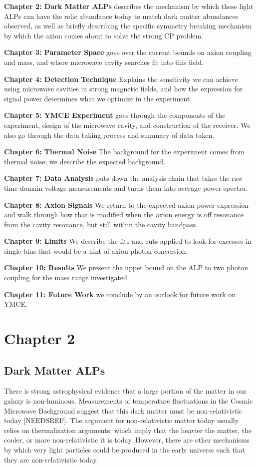 \documentclass[11pt]{book}
\begin{document}
\textbf{Chapter 2: Dark Matter ALPs} describes the mechanism by which these light ALPs can have the relic abundance today to match dark matter abundances observed, as well as briefly describing the specific symmetry breaking mechanism by which the axion comes about to solve the strong CP problem.

\textbf{Chapter 3: Parameter Space} goes over the current bounds on axion coupling and mass, and where microwave cavity searches fit into this field.

\textbf{Chapter 4: Detection Technique} Explains the sensitivity we can achieve using microwave cavities in strong magnetic fields, and how the expression for signal power determines what we optimize in the experiment

\textbf{Chapter 5: YMCE Experiment} goes through the components of the experiment, design of the microwave cavity, and construction of the receiver. We also go through the data taking process and summary of data taken.

\textbf{Chapter 6: Thermal Noise} The background for the experiment comes from thermal noise; we describe the expected background.

\textbf{Chapter 7: Data Analysis} puts down the analysis chain that takes the raw time domain voltage measurements and turns them into average power spectra. 

\textbf{Chapter 8: Axion Signals} We return to the expected axion power expression and walk through how that is modified when the axion energy is off resonance from the cavity resonance, but still within the cavity bandpass.

\textbf{Chapter 9:  Limits} We describe the fits and cuts applied to look for excesses in single bins that would be a hint of axion photon conversion.

\textbf{Chapter 10: Results} We present the upper bound on the ALP to two photon coupling for the mass range investigated.

\textbf{Chapter 11: Future Work} we conclude by an outlook for future work on YMCE.

\chapter{Chapter 2}
\section{Dark Matter ALPs}

There is strong astrophysical evidence that a large portion of the matter in our galaxy is non-luminous. Measurements of temperature fluctuations in the Cosmic Microwave Background suggest that this dark matter must be non-relativistic today [NEEDSREF]. The argument for non-relativistic matter today usually relies on thermalization arguments; which imply that the heavier the matter, the cooler, or more non-relativistic it is today. However, there are other mechanisms by which very light particles could be produced in the early universe such that they are non-relativistic today.
\end{document}

